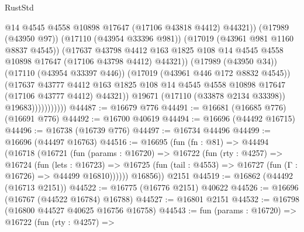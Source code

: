 \begin{lexlean}{RustStd}
\begin{coremodule}
                                  @14
                                  @4545
                                  @4558
                                  @10898
                                  @17647
                                  (@17106 @43818 @4412)
                                  @44321))
                              (@17989 (@43950 @97))
                              (@17110 (@43954 @33396 @981))
                              (@17019 (@43961 @981 @1160 @8837 @4545))
                              (@17637
                                @43798
                                @4412
                                @163
                                @1825
                                @108
                                @14
                                @4545
                                @4558
                                @10898
                                @17647
                                (@17106 @43798 @4412)
                                @44321))
                            (@17989 (@43950 @34))
                            (@17110 (@43954 @33397 @446))
                            (@17019 (@43961 @446 @172 @8832 @4545))
                            (@17637
                              @43777
                              @4412
                              @163
                              @1825
                              @108
                              @14
                              @4545
                              @4558
                              @10898
                              @17647
                              (@17106 @43777 @4412)
                              @44321))
                          @19671
                          (@17110 (@33878 @2134 @33398))
                          @19683)))))))))))
@44487 := @16679 @776
@44491 := @16681 (@16685 @776) (@16691 @776)
@44492 := @16700 @40619
@44494 := @16696 (@44492 @16715)
@44496 := @16738 (@16739 @776)
@44497 := @16734 @44496
@44499 := @16696 (@44497 @16763)
@44516 := @16695
    (fun (fn : @81) =>
    @44494
      (@16718
        (@16721
          (fun (params : @16720) =>
          @16722
            (fun (rty : @4257) =>
            @16724
              (fun (lets : @16723) =>
              @16725 (fun (tail : @4553) => @16727 (fun (Γ : @16726) => @44499 @16810))))))
        @16856))
    @2151
@44519 := @16862 (@44492 (@16713 @2151))
@44522 := @16775 (@16776 @2151) @40622
@44526 := @16696 (@16767 (@44522 @16784) @16788)
@44527 := @16801 @2151
@44532 := @16798 (@16800 @44527 @40625 @16756 @16758)
@44543 := fun (params : @16720) =>
  @16722
    (fun (rty : @4257) =>

\end{coremodule}
\end{lexlean}
